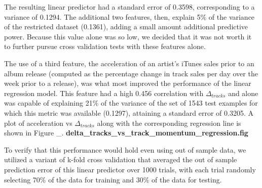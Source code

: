 \documentclass[conference]{IEEEtran}
\begin{document}
The resulting linear predictor had a standard error of 0.3598, corresponding to a variance of 0.1294. The additional two features, then, explain 5\% of the variance of the restricted dataset (0.1361), adding a small amount additional predictive power. Because this value alone was so low, we decided that it was not worth it to further pursue cross validation tests with these features alone.

The use of a third feature, the acceleration of an artist's iTunes sales prior to an album release (computed as the percentage change in track sales per day over the week prior to a release), was what most improved the performance of the linear regression model. This feature had a high 0.456 correlation with $\Delta_{tracks}$ and alone was capable of explaining 21\% of the variance of the set of 1543 test examples for which this metric was available (0.1297), attaining a standard error of 0.3205. A plot of acceleration vs $\Delta_{tracks}$ along with the corresponding regression line is shown in Figure \_. \textbf{delta\_tracks\_vs\_track\_momentum\_regression.fig}

To verify that this performance would hold even using out of sample data, we utilized a variant of k-fold cross validation that averaged the out of sample prediction error of this linear predictor over 1000 trials, with each trial randomly selecting 70\% of the data for training and 30\% of the data for testing.
\end{document}
